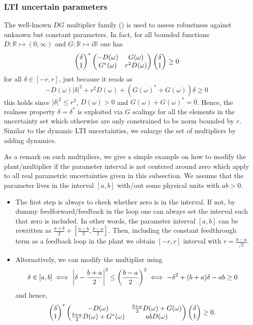 \subsubsection{LTI uncertain parameters} The well-known $DG$ multiplier family (\cite{meinsmafu,fantits}) 
is used to assess robustness against unknown but constant parameters. In fact, for all bounded functions 
$D:\mathbb{R}\mapsto(0,\infty)$ and $G:\mathbb{R}\mapsto i\mathbb{R}$ one has
\begin{equation*}
\begin{pmatrix}\delta\\1\end{pmatrix}^*\begin{pmatrix}-D(\omega) &G(\omega)\\G^*(\omega) &r^2D(\omega)\end{pmatrix}\begin{pmatrix}\delta\\1\end{pmatrix}\geq 0
\end{equation*}
for all $\delta\in[-r,r]$, just because it reads as
\[-D(\omega)|\delta|^2 + r^2 D(\omega) + (G(\omega)^*+G(\omega))\delta\geq 0\]
this holds since $|\delta|^2\leq r^2$, $D(\omega)>0$ and $G(\omega)+G(\omega)^*=0$. Hence, the realness property 
$\delta=\delta^*$ is exploited via $G$ scalings for all the elements in the uncertainty set which otherwise are only constrained 
to be norm bounded by $r$. Similar to the dynamic LTI uncertainties, we enlarge the set of multipliers by adding 
dynamics. 

As a remark on such multipliers, we give a simple example on how to modify the plant/multiplier if the parameter interval 
is not centered around zero which apply to all real parametric uncertainties given in this subsection. We assume that 
the parameter lives in the interval $[a,b]$ with/out some physical units with $ab>0$. 
\begin{itemize}
	\item The first step is always to check whether zero is in the interval. If not, by dummy feedforward/feedback 
in the loop one can always set the interval such that zero is included. In other words, the parameter interval $[a,b]$
can be rewritten as $\frac{a+b}{2} + [\frac{a-b}{2},\frac{b-a}{2}]$. Then, including the constant feedthrough term as a 
feedback loop in the plant we obtain $[-r,r]$ interval with $r=\frac{b-a}{/2}$.
    \item Alternatively, we can modify the multiplier using \[\delta\in[a,b] \iff \displaystyle \left|\delta- \frac{b+a}{2}\right|^2\leq 
    \left(\frac{b-a}{2}\right)^2\iff -\delta^2 + (b+a)\delta -ab\geq 0\] and hence,
    \[
    \begin{pmatrix}\delta\\1\end{pmatrix}^*\begin{pmatrix}-D(\omega) & \frac{b+a}{2}D(\omega) + G(\omega)\\ 
    \frac{b+a}{2}D(\omega) + G^*(\omega) &abD(\omega)\end{pmatrix}\begin{pmatrix}\delta\\1\end{pmatrix}\geq 0.
    \]
\end{itemize} 




